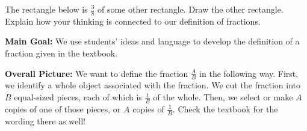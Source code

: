 \documentclass[nooutcomes,noauthor,handout]{ximera}
\begin{document}
\begin{problem}
	The rectangle below is $\frac{3}{8}$ of some other rectangle. Draw the other rectangle. Explain how your thinking is connected to our definition of fractions. 
	
	\begin{image}
	\end{image}
\end{problem}





\newpage
\begin{instructorNotes}


{\bf Main Goal:} We use students' ideas and language to develop the definition of a fraction given in the textbook. 


{\bf Overall Picture:} 
We want to define the fraction $\frac{A}{B}$ in the following way. First, we identify a whole object associated with the fraction. We cut the fraction into $B$ equal-sized pieces, each of which is $\frac{1}{B}$ of the whole. Then, we select or make $A$ copies of one of those pieces, or $A$ copies of $\frac{1}{B}$. Check the textbook for the wording there as well!


\end{instructorNotes}
\end{document}
